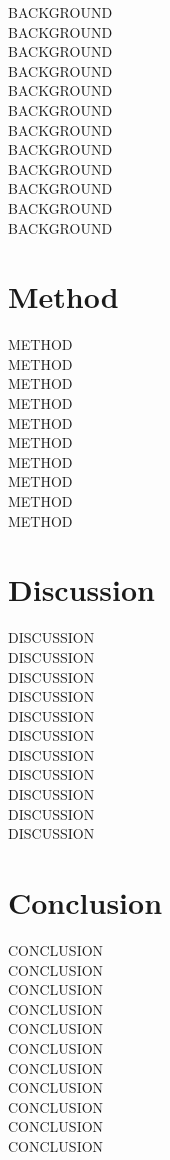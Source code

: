 \documentclass[acmtog]{techreportacmart}
\begin{document}
BACKGROUND \\
BACKGROUND \\
BACKGROUND \\
BACKGROUND \\
BACKGROUND \\
BACKGROUND \\
BACKGROUND \\
BACKGROUND \\
BACKGROUND \\
BACKGROUND \\
BACKGROUND \\
BACKGROUND \\
%
%


\section{Method}
METHOD \\
METHOD \\
METHOD \\
METHOD \\
METHOD \\
METHOD \\
METHOD \\
METHOD \\
METHOD \\
METHOD \\


\section{Discussion}
DISCUSSION \\
DISCUSSION \\
DISCUSSION \\
DISCUSSION \\
DISCUSSION \\
DISCUSSION \\
DISCUSSION \\
DISCUSSION \\
DISCUSSION \\
DISCUSSION \\
DISCUSSION \\


\section{Conclusion}
CONCLUSION \\
CONCLUSION \\
CONCLUSION \\
CONCLUSION \\
CONCLUSION \\
CONCLUSION \\
CONCLUSION \\
CONCLUSION \\
CONCLUSION \\
CONCLUSION \\
CONCLUSION \\




\end{document}
